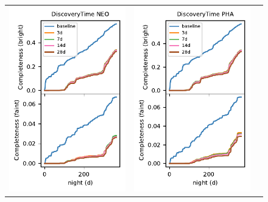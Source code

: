 \documentclass[preprintm,linenumbers]{aastex631}
\begin{document}
\begin{figure}
\begin{tabular}{@{}c@{}c@{}c@{}}
				\includegraphics{results/DiscoveryTime_NEO_first_year_one_snap_v4_0_10yrs_db_n_visits_4_noDD_noTwi.pdf} &
				\includegraphics{results/DiscoveryTime_PHA_first_year_one_snap_v4_0_10yrs_db_n_visits_4_noDD_noTwi.pdf} \\

\end{tabular}
\end{figure}
\end{document}
